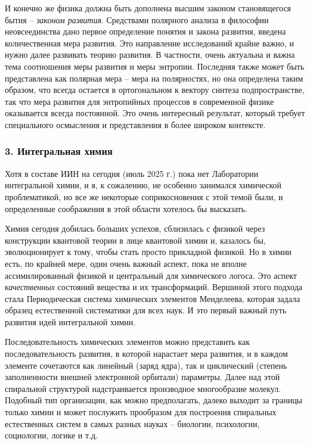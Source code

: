     И конечно же физика должна быть дополнена высшим законом становящегося бытия – \textit{законом развития}. Средствами полярного анализа в философии неовсеединства дано первое определение понятия и закона развития, введена количественная мера развития. Это направление исследований крайне важно, и нужно далее развивать теорию развития. В частности, очень актуальна и важна тема соотношения меры развития и меры энтропии. Последняя также может быть представлена как полярная мера – мера на полярностях, но она определена таким образом, что всегда остается в ортогональном к вектору синтеза подпространстве, так что мера развития для энтропийных процессов в современной физике оказывается всегда постоянной. Это очень интересный результат, который требует специального осмысления и представления в более широком контексте.

    \subsubsection*{3. Интегральная химия}
    Хотя в составе ИИН на сегодня (июль 2025 г.) пока нет Лаборатории интегральной химии, и я, к сожалению, не особенно занимался химической проблематикой, но все же некоторые соприкосновения с этой темой были, и определенные соображения в этой области хотелось бы высказать.

    Химия сегодня добилась больших успехов, сблизилась с физикой через конструкции квантовой теории в лице квантовой химии и, казалось бы, эволюционирует к тому, чтобы стать просто прикладной физикой. Но в химии есть, по крайней мере, один очень важный аспект, пока не вполне ассимилированный физикой и центральный для химического логоса. Это аспект \textit{качественных} состояний вещества и их трансформаций. Вершиной этого подхода стала Периодическая система химических элементов Менделеева, которая задала образец естественной систематики для всех наук. И это первый важный путь развития идей интегральной химии.

    Последовательность химических элементов можно представить как последовательность развития, в которой нарастает мера развития, и в каждом элементе сочетаются как линейный (заряд ядра), так и циклический (степень заполненности внешней электронной орбитали) параметры. Далее над этой спиральной структурой надстраивается производное многообразие молекул. Подобный тип организации, как можно предполагать, далеко выходит за границы только химии и может послужить прообразом для построения спиральных естественных систем в самых разных науках – биологии, психологии, социологии, логике и т.д.

